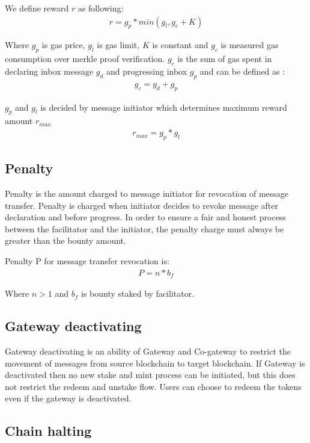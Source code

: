 \documentclass[12pt,a4paper]{article}
\begin{document}
We define reward $r$ as following:
 \begin{align}
 	r  = g_p  *  min(g_l, g_c + K) 
 \end{align}
                         
Where $g_p$ is gas price, $g_l$  is gas limit,  $K$ is constant and $g_c$  is measured gas consumption over merkle proof verification. $g_c$ is the sum of gas spent in declaring inbox message $g_d$ and progressing inbox $g_p$ and can be defined as :
 \begin{align}
 	g_c  = g_d  + g_p
 \end{align}
                                     
$g_p$ and $g_l$ is decided by message initiator which determines maximum reward amount $r_{max}$
 \begin{align}
 	r_{max}  = g_p *  g_l
 \end{align}

\subsection{Penalty}\label{gateway:penalty}
Penalty is the amount charged to message initiator for revocation of message transfer. 
Penalty is charged when initiator decides to revoke message after declaration and before progress.  
In order to ensure a fair and honest process between the facilitator and the initiator, the penalty charge must always be greater than the bounty amount.  

Penalty P for message transfer revocation is:
 \begin{align}
 	P = n * b_f
 \end{align}
                                           
Where $n > 1$  and $b_f$ is bounty staked by facilitator. 

\subsection{Gateway deactivating}\label{gateway:deactivating}
Gateway deactivating is an ability of Gateway and Co-gateway to restrict the movement of messages from source blockchain to target blockchain. 
If Gateway is deactivated then no new stake and mint process can be initiated, but this does not restrict the redeem and unstake flow. 
Users can choose to redeem the tokens even if the gateway is deactivated.

\subsection{Chain halting}
                                                            
\end{document}
